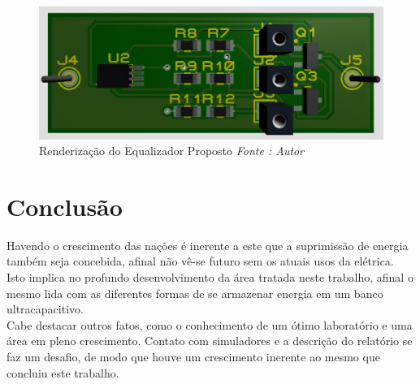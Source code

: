 \documentclass[11pt, a4paper, oneside]{article}
\begin{document}
\begin{figure}[h!]
\centering
\includegraphics[width=1\linewidth]{Renderizacao_equalizer}
\caption{Renderização do Equalizador Proposto \textit{Fonte : Autor}}
\label{fig:renderizacao_do_equalizador_proposto}
\end{figure}

\section{Conclusão}
Havendo o crescimento das nações é inerente a este que a suprimissão de energia também seja concebida, afinal não vê-se futuro sem os atuais usos da elétrica.
Isto implica no profundo desenvolvimento da área tratada neste trabalho, afinal o mesmo lida com as diferentes formas de se armazenar energia em um banco 
ultracapacitivo.\\
Cabe destacar outros fatos, como o conhecimento de um ótimo laboratório e uma área em pleno crescimento. Contato com simuladores e a descrição do relatório 
se faz um desafio, de modo que houve um crescimento inerente ao mesmo que concluiu este trabalho.

\newpage


 
\end{document}
